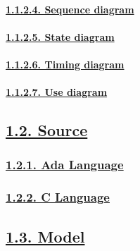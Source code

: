 \documentclass[
]{article}
\begin{document}
\hypertarget{sequence-diagram}{%
\paragraph{\texorpdfstring{\protect\hyperlink{sequence-diagram-1}{1.1.2.4.
Sequence diagram}}{1.1.2.4. Sequence diagram}}\label{sequence-diagram}}

\hypertarget{state-diagram}{%
\paragraph{\texorpdfstring{\protect\hyperlink{state-diagram-1}{1.1.2.5.
State diagram}}{1.1.2.5. State diagram}}\label{state-diagram}}

\hypertarget{timing-diagram}{%
\paragraph{\texorpdfstring{\protect\hyperlink{timing-diagram-1}{1.1.2.6.
Timing diagram}}{1.1.2.6. Timing diagram}}\label{timing-diagram}}

\hypertarget{use-diagram}{%
\paragraph{\texorpdfstring{\protect\hyperlink{use-diagram-1}{1.1.2.7.
Use diagram}}{1.1.2.7. Use diagram}}\label{use-diagram}}

\hypertarget{source}{%
\subsection{\texorpdfstring{\protect\hyperlink{source-1}{1.2.
Source}}{1.2. Source}}\label{source}}

\hypertarget{ada-language}{%
\subsubsection{\texorpdfstring{\protect\hyperlink{ada-language-1}{1.2.1.
Ada Language}}{1.2.1. Ada Language}}\label{ada-language}}

\hypertarget{c-language}{%
\subsubsection{\texorpdfstring{\protect\hyperlink{c-language-1}{1.2.2. C
Language}}{1.2.2. C Language}}\label{c-language}}

\hypertarget{model}{%
\subsection{\texorpdfstring{\protect\hyperlink{model-1}{1.3.
Model}}{1.3. Model}}\label{model}}
\end{document}
